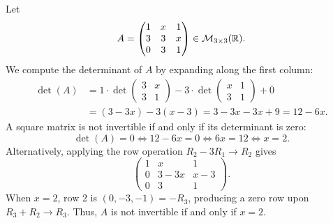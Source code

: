 \begin{exercisesolution*}
\label{sol:parametric_3x3_invertibility_mc}
Let
\[
A = \begin{pmatrix} 1 & x & 1 \\ 3 & 3 & x \\ 0 & 3 & 1 \end{pmatrix} \in \mathcal{M}_{3 \times 3}(\mathbb{R}).
\]
We compute the determinant of $A$ by expanding along the first column:
\begin{align*}
\det(A) &= 1 \cdot \det\begin{pmatrix} 3 & x \\ 3 & 1 \end{pmatrix} - 3 \cdot \det\begin{pmatrix} x & 1 \\ 3 & 1 \end{pmatrix} + 0 \\
&= (3 - 3x) - 3(x - 3) = 3 - 3x - 3x + 9 = 12 - 6x.
\end{align*}
A square matrix is not invertible if and only if its determinant is zero:
\[
\det(A) = 0 \iff 12 - 6x = 0 \iff 6x = 12 \iff x = 2.
\]
Alternatively, applying the row operation $R_2 - 3R_1 \to R_2$ gives
\[
\begin{pmatrix} 1 & x & 1 \\ 0 & 3-3x & x-3 \\ 0 & 3 & 1 \end{pmatrix}.
\]
When $x = 2$, row 2 is $(0, -3, -1) = -R_3$, producing a zero row upon $R_3 + R_2 \to R_3$.
Thus, $A$ is not invertible if and only if $x = 2$.
\end{exercisesolution*}
